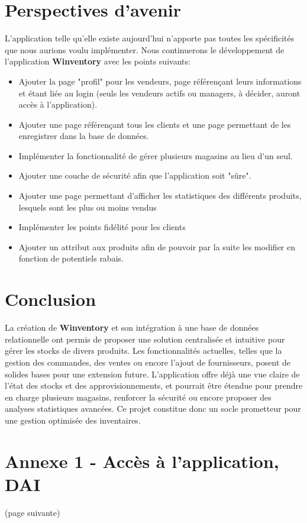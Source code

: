 \documentclass[12pt]{report}
\begin{document}
    \section*{Perspectives d'avenir}
    L'application telle qu'elle existe aujourd'hui n'apporte pas toutes les spécificités que nous aurions voulu implémenter.
    Nous continuerons le développement de l'application \textbf{Winventory} avec les points suivants:
    \begin{itemize}
        \item Ajouter la page "profil" pour les vendeurs, page référençant leurs informations et étant liée au login (seuls les
        vendeurs actifs ou managers, à décider, auront accès à l'application).
        \item Ajouter une page référençant tous les clients et une page permettant de les enregistrer dans la base de données.
        \item Implémenter la fonctionnalité de gérer plusieurs magasins au lieu d'un seul.
        \item Ajouter une couche de sécurité afin que l'application soit "sûre".
        \item Ajouter une page permettant d'afficher les statistiques des différents produits, lesquels sont les plus ou moins vendus
        \item Implémenter les points fidélité pour les clients
        \item Ajouter un attribut aux produits afin de pouvoir par la suite les modifier en fonction de potentiels rabais.
    \end{itemize}

    \section*{Conclusion}

    La création de \textbf{Winventory} et son intégration à une base de données relationnelle ont permis de proposer une
    solution centralisée et intuitive pour gérer les stocks de divers produits. Les fonctionnalités actuelles, telles que
    la gestion des commandes, des ventes ou encore l’ajout de fournisseurs, posent de solides bases pour une extension future.
    L’application offre déjà une vue claire de l’état des stocks et des approvisionnements, et pourrait être étendue pour
    prendre en charge plusieurs magasins, renforcer la sécurité ou encore proposer des analyses statistiques avancées.
    Ce projet constitue donc un socle prometteur pour une gestion optimisée des inventaires.

    \appendix
    \appendixpage
    \addappheadtotoc
    \section{Annexe 1 - Accès à l'application, DAI}
    (page suivante)
    
\end{document}
